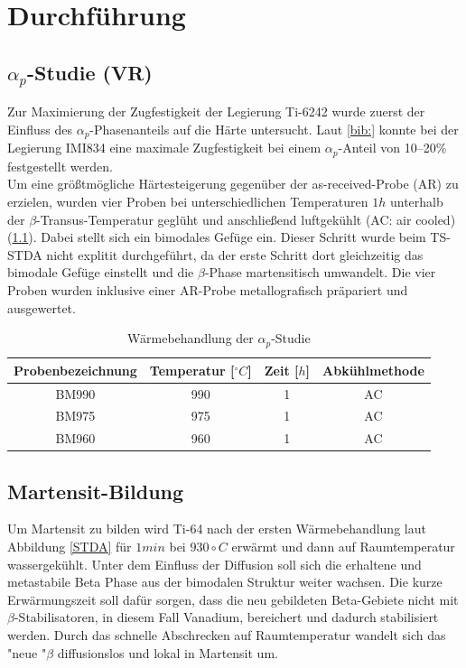 \chapter{Durchführung}

\section{$\alpha_p$-Studie (VR)}
Zur Maximierung der Zugfestigkeit der Legierung Ti-6242 wurde zuerst der Einfluss des $\alpha_p$-Phasenanteils auf die Härte untersucht. Laut \ref{bib:} konnte bei der Legierung IMI834 eine maximale Zugfestigkeit bei einem $\alpha_p$-Anteil von 10--20\% festgestellt werden. \\
Um eine größtmögliche Härtesteigerung gegenüber der as-received-Probe (AR) zu erzielen, wurden vier Proben bei unterschiedlichen Temperaturen $1h$ unterhalb der $\beta$-Transus-Temperatur geglüht und anschließend luftgekühlt (AC: air cooled) (\ref{tab:alphap}). Dabei stellt sich ein bimodales Gefüge ein. Dieser Schritt wurde beim TS-STDA nicht explitit durchgeführt, da der erste Schritt dort gleichzeitig das bimodale Gefüge einstellt und die $\beta$-Phase martensitisch umwandelt. Die vier Proben wurden inklusive einer AR-Probe metallografisch präpariert und ausgewertet.



\begin{table}
	\centering
	\begin{tabular}{|c|c|c|c|}
	\hline 
	Probenbezeichnung & Temperatur [$^\circ C$] & Zeit [$h$] & Abkühlmethode \\ 
	\hline 
	BM990 & 990 & 1 & AC\\ 
	\hline 
	
	BM975 & 975 & 1 & AC\\ 
	\hline 
	BM960 & 960 & 1 & AC\\ 
	\hline 
	\end{tabular} 
	\caption{Wärmebehandlung der $\alpha_p$-Studie}
	\label{tab:alphap}
\end{table}


\section{Martensit-Bildung}

Um Martensit zu bilden wird Ti-64 nach der ersten Wärmebehandlung laut Abbildung \ref{STDA} für $1 min$  bei $930\circ C$ erwärmt und dann  auf Raumtemperatur wassergekühlt. Unter dem Einfluss der Diffusion soll sich die erhaltene und metastabile Beta Phase aus der bimodalen Struktur weiter wachsen. Die kurze Erwärmungszeit soll dafür sorgen, dass die neu gebildeten Beta-Gebiete nicht mit $\beta$-Stabilisatoren, in diesem Fall Vanadium, bereichert  und dadurch stabilisiert werden. Durch das schnelle Abschrecken auf Raumtemperatur wandelt sich das "neue "$\beta$ diffusionslos und lokal in Martensit um.

